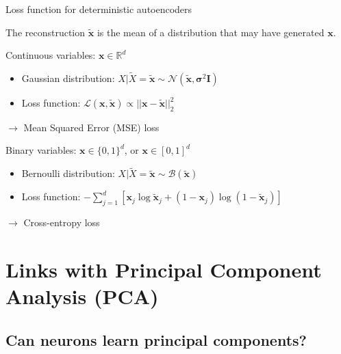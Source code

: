 \documentclass[handout]{beamer}
\begin{document}
  \begin{frame}{Loss function for deterministic autoencoders}


    The reconstruction $\tilde{\mathbf{x}}$ is the \alert{mean} of a distribution that may have generated $\mathbf{x}$.
    \pause
    \begin{block}{Continuous variables: $\mathbf{x} \in \mathbb{R}^d$}
      \begin{itemize}
        \item Gaussian distribution: $X|\tilde{X} = \tilde{\mathbf{x}} \sim \mathcal{N}(\tilde{\mathbf{x}}, \mathbf{\sigma}^2 \mathbf{I})$
      \item Loss function: $\mathcal{L}(\mathbf{x}, \tilde{\mathbf{x}}) \propto ||\mathbf{x} - \tilde{\mathbf{x}}||_2^2$
      \end{itemize}
      $\rightarrow$ \alert{Mean Squared Error (MSE) loss}
    \end{block}
    \pause
    \begin{block}{Binary variables: $\mathbf{x} \in \{0,1\}^d$, or $\mathbf{x} \in [0,1]^d$}
      \begin{itemize}
        \item Bernoulli distribution: $X|\tilde{X} = \tilde{\mathbf{x}} \sim \mathcal{B}(\tilde{\mathbf{x}})$
        \item Loss function: $-\sum_{j=1}^d [\mathbf{x}_j \log \tilde{\mathbf{x}}_j + (1-\mathbf{x}_j) \log (1-\tilde{\mathbf{x}}_j)]$
      \end{itemize}
      $\rightarrow$ \alert{Cross-entropy loss}
    \end{block}
    
  \end{frame}

  \section{Links with Principal Component Analysis (PCA)}

  \subsection{Can neurons learn principal components?}
\end{document}
